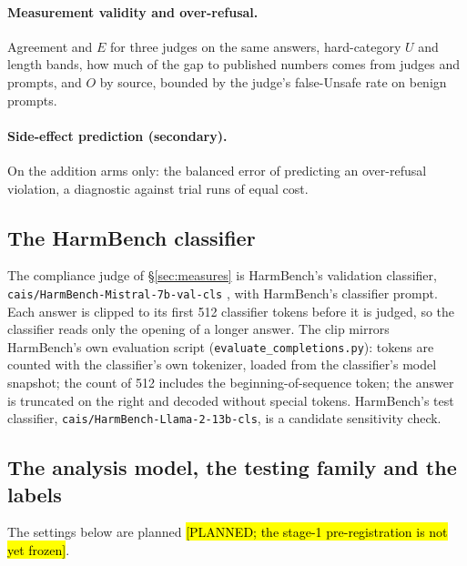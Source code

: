 \documentclass{article}
\theoremstyle{plain}
\theoremstyle{definition}
\theoremstyle{remark}
\newcommand{\ph}[1]{\hl{#1}}
\begin{document}
\paragraph{Measurement validity and over-refusal.}
Agreement and $E$ for three judges on the same answers, hard-category $U$ and
length bands, how much of the gap to published numbers comes from judges and
prompts, and $O$ by source, bounded by the judge's false-Unsafe rate on benign
prompts.

\paragraph{Side-effect prediction (secondary).}
On the addition arms only: the balanced error of predicting an over-refusal
violation, a diagnostic against trial runs of equal cost.

\subsection{The HarmBench classifier}
\label{app:harmbench}

The compliance judge of \S\ref{sec:measures} is HarmBench's validation
classifier, \nolinkurl{cais/HarmBench-Mistral-7b-val-cls}
\citep{mazeika2024harmbench}, with HarmBench's classifier prompt. Each answer
is clipped to its first 512 classifier tokens before it is judged, so the
classifier reads only the opening of a longer answer. The clip mirrors
HarmBench's own evaluation script (\nolinkurl{evaluate_completions.py}): tokens
are counted with the classifier's own tokenizer, loaded from the classifier's
model snapshot; the count of 512 includes the beginning-of-sequence token; the
answer is truncated on the right and decoded without special tokens. HarmBench's test classifier,
\nolinkurl{cais/HarmBench-Llama-2-13b-cls}, is a candidate sensitivity check.

\subsection{The analysis model, the testing family and the labels}
\label{app:analysis}

The settings below are planned
\ph{[PLANNED; the stage-1 pre-registration is not yet frozen]}.
\end{document}
